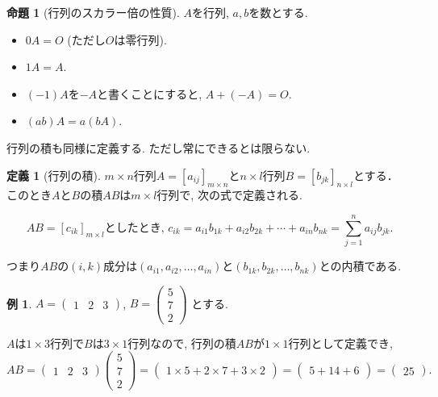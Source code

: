 \documentclass[dvipdfmx,a4paper,11pt]{article}
\theoremstyle{definition}
\newtheorem{prop}[thm]{命題}
\newtheorem{dfn}[thm]{定義}
\newtheorem{exa}[thm]{例}
\begin{document}
 
 \begin{tcolorbox}[
    colback = white,
    colframe = green!35!black,
    fonttitle = \bfseries,
    breakable = true]
    \begin{prop}[行列のスカラー倍の性質]
$A$を行列, $a,b$を数とする.
 \begin{itemize}
 	\setlength{\parskip}{0cm}
  	\setlength{\itemsep}{0pt} 
 \item $0A =O$ (ただし$O$は零行列).
  \item $1A=A$. 
  \item $(-1)A$を$-A$と書くことにすると, $A + (-A) =O$.　
  \item $(ab) A = a(bA)$.
 \end{itemize}
  \end{prop}
 \end{tcolorbox}
 
行列の積も同様に定義する. 
ただし常にできるとは限らない. 


\begin{tcolorbox}[
    colback = white,
    colframe = green!35!black,
    fonttitle = \bfseries,
    breakable = true]
    \begin{dfn}[行列の積]
    
 $m \times n$行列$A = [a_{ij}]_{m \times n}$と$n \times l$行列$B= [b_{jk}]_{n \times l}$とする．
このとき$A$と$B$の積$AB$は$m \times l$行列で, 次の式で定義される.

$$
AB = [c_{ik}]_{m \times l}\text{としたとき, }
c_{ik} = a_{i1}b_{1k} + a_{i2}b_{2k} + \cdots + a_{in}b_{nk} = \sum_{j=1}^{n} a_{ij}b_{jk}.
$$

つまり$AB$の$(i,k)$成分は$(a_{i1}, a_{i2}, \ldots, a_{in})$と$(b_{1k}, b_{2k}, \ldots, b_{nk})$との内積である. 
  \end{dfn}
 \end{tcolorbox}
 
 \begin{exa}
 $ A=\begin{pmatrix} 1 &2 &3 \end{pmatrix}$, 
 $ 
 B = 
 \begin{pmatrix}
5 \\7\\2
 \end{pmatrix}
 $
 とする. 
 
 $A$は$1\times 3$行列で$B$は$3 \times 1$行列なので, 行列の積$AB$が$1 \times 1$行列として定義でき, 
 $$
 AB = \begin{pmatrix}1 &2&3  \end{pmatrix}
 \begin{pmatrix}
5 \\7\\2
 \end{pmatrix}
 = \begin{pmatrix}1\times 5 + 2 \times 7 + 3 \times 2  \end{pmatrix}= 
  \begin{pmatrix}5+14+6 \end{pmatrix}= \begin{pmatrix}25 \end{pmatrix}.
 $$
 
 \end{exa}
 
\end{document}
